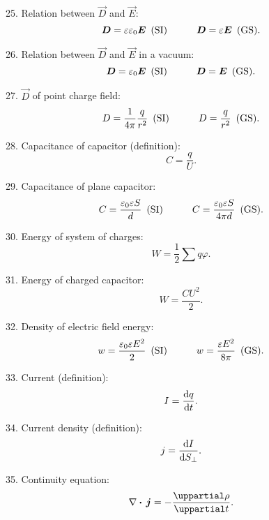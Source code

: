25. Relation between $\vec{D}$ and $\vec{E}$:
\begin{equation*}
	\boldsymbol{D}=\varepsilon\varepsilon_0\boldsymbol{E} \,\,\,\text{(SI)}\quad\quad\quad \boldsymbol{D}=\varepsilon\boldsymbol{E} \,\,\,\text{(GS)}.
\end{equation*}

26. Relation between $\vec{D}$ and $\vec{E}$ in
a vacuum:
\begin{equation*}
	\boldsymbol{D}=\varepsilon_0\boldsymbol{E} \,\,\,\text{(SI)}\quad\quad\quad \boldsymbol{D}=\boldsymbol{E} \,\,\,\text{(GS)}.
\end{equation*}

27. $\vec{D}$ of point charge field:
\begin{equation*}
	D=\frac{1}{4\pi} \frac{q}{r^2} \,\,\,\text{(SI)}\quad\quad\quad D=\frac{q}{r^2} \,\,\,\text{(GS)}.
\end{equation*}

28. Capacitance of capacitor (definition):
\begin{equation*}
	C = \frac{q}{U}.
\end{equation*}

29. Capacitance of plane capacitor:
\begin{equation*}
	C=\frac{\varepsilon_0\varepsilon S}{d} \,\,\,\text{(SI)}\quad\quad\quad C=\frac{\varepsilon_0\varepsilon S}{4\pi d} \,\,\,\text{(GS)}.
\end{equation*}

30. Energy of system of charges:
\begin{equation*}
	W = \frac{1}{2} \sum q\varphi.
\end{equation*}

31. Energy of charged capacitor:
\begin{equation*}
	W = \frac{CU^2}{2}.
\end{equation*}

32. Density of electric field energy:
\begin{equation*}
	w=\frac{\varepsilon_0\varepsilon E^2}{2} \,\,\,\text{(SI)}\quad\quad\quad w=\frac{\varepsilon E^2}{8\pi} \,\,\,\text{(GS)}.
\end{equation*}

33. Current (definition):
\begin{equation*}
	I = \dfrac{\mathrm{d} q}{\mathrm{d} t}.
\end{equation*}

34. Current density (definition):
\begin{equation*}
	j = \dfrac{\mathrm{d} I}{\mathrm{d} S_{\perp}}.
\end{equation*}

35. Continuity equation:
\begin{equation*}
	\divop{\vec{j}} = - \diffpartial{\rho}{t}.
\end{equation*}


